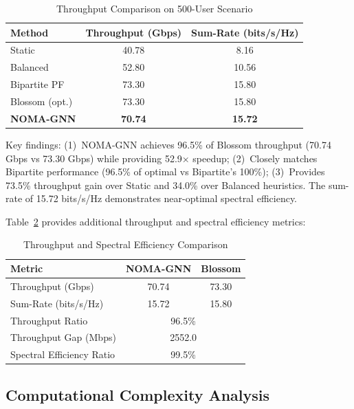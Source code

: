 \begin{table}[!t]
\centering
\caption{Throughput Comparison on 500-User Scenario}
\label{tab:throughput_stats}
\begin{tabular}{l c c}
\toprule
\textbf{Method} & \textbf{Throughput (Gbps)} & \textbf{Sum-Rate (bits/s/Hz)} \\
\midrule
Static & 40.78 & 8.16 \\
Balanced & 52.80 & 10.56 \\
Bipartite PF & 73.30 & 15.80 \\
Blossom (opt.) & 73.30 & 15.80 \\
\textbf{NOMA-GNN} & \textbf{70.74} & \textbf{15.72} \\
\bottomrule
\end{tabular}
\end{table}

Key findings: (1)~NOMA-GNN achieves 96.5\% of Blossom throughput (70.74 Gbps vs 73.30 Gbps) while providing 52.9× speedup; (2)~Closely matches Bipartite performance (96.5\% of optimal vs Bipartite's 100\%); (3)~Provides 73.5\% throughput gain over Static and 34.0\% over Balanced heuristics. The sum-rate of 15.72 bits/s/Hz demonstrates near-optimal spectral efficiency.

Table~\ref{tab:throughput_detailed} provides additional throughput and spectral efficiency metrics:

\begin{table}[!t]
\centering
\caption{Throughput and Spectral Efficiency Comparison}
\label{tab:throughput_detailed}
\begin{tabular}{lcc}
\toprule
\textbf{Metric} & \textbf{NOMA-GNN} & \textbf{Blossom} \\
\midrule
Throughput (Gbps) & 70.74 & 73.30 \\
Sum-Rate (bits/s/Hz) & 15.72 & 15.80 \\
\midrule
Throughput Ratio & \multicolumn{2}{c}{96.5\%} \\
Throughput Gap (Mbps) & \multicolumn{2}{c}{2552.0} \\
Spectral Efficiency Ratio & \multicolumn{2}{c}{99.5\%} \\
\bottomrule
\end{tabular}
\end{table}

\subsection{Computational Complexity Analysis}

